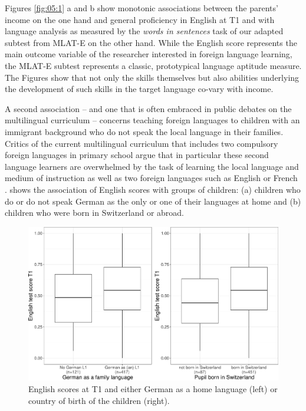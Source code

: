 \documentclass[output=paper]{langsci/langscibook}
\begin{document}
Figures \ref{fig:05:1} a and b show monotonic associations between the parents’ income on the one hand and general proficiency in English at T1 and with language analysis as measured by the \textit{words in sentences} task of our adapted subtest from MLAT-E on the other hand. While the English score represents the main outcome variable of the researcher interested in foreign language learning, the MLAT-E subtest represents a classic, prototypical language aptitude measure. The Figures show that not only the skills themselves but also abilities underlying the development of such skills in the target language co-vary with income.

A second association -- and one that is often embraced in public debates on the multilingual curriculum -- concerns teaching foreign languages to children with an immigrant background who do not speak the local language in their families. Critics of the current multilingual curriculum that includes two compulsory foreign languages in primary school argue that in particular these second language learners are overwhelmed by the task of learning the local language and medium of instruction as well as two foreign languages such as English or French \citep{KüblerEtAl2014}.  shows the association of English scores with groups of children: (a) children who do or do not speak German as the only or one of their languages at home and (b) children who were born in Switzerland or abroad.

\begin{figure}
\includegraphics[width=\textwidth]{figures/Figure5.2.pdf}
\caption{English scores at T1 and either German as a home language (left) or country of birth of the children (right).\label{fig:05:2}}
\end{figure}
\end{document}
